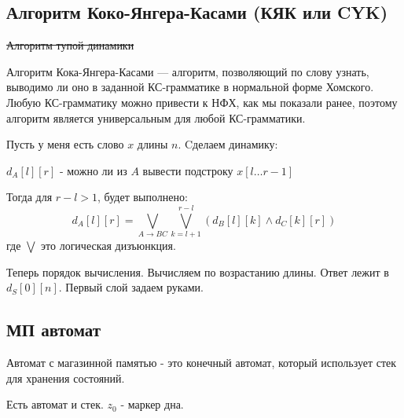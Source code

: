 \subsection{Алгоритм Коко-Янгера-Касами (КЯК или CYK)}

\sout{Алгоритм тупой динамики}

Алгоритм Кока-Янгера-Касами --- алгоритм, позволяющий по слову узнать, выводимо ли оно в заданной КС-грамматике в нормальной форме Хомского. Любую КС-грамматику можно привести к НФХ, как мы показали ранее, поэтому алгоритм является универсальным для любой КС-грамматики.

Пусть у меня есть слово $x$ длины $n$. Cделаем динамику:

$d_A[l][r]$ - можно ли из $A$ вывести подстроку $x[l\ldots r-1]$

Тогда для $r-l >1$, будет выполнено:
$$d_A [l][r] = \bigvee\limits_{A\xrightarrow{} BC} \bigvee\limits_{k=l+1}^{r-l}(d_B[l][k] \wedge d_C[k][r])$$ где $\bigvee$ это логическая дизъюнкция.

Теперь порядок вычисления. Вычисляем по возрастанию длины. Ответ лежит в $d_S[0][n]$. Первый слой задаем руками.

\subsection{МП автомат}

Автомат с магазинной памятью -  это конечный автомат, который использует стек для хранения состояний.

Есть автомат и стек. $z_0$ - маркер дна. 
